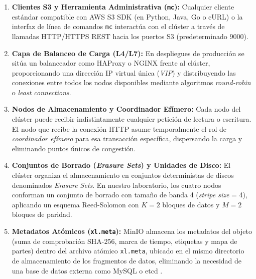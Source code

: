 \documentclass[12pt,a4paper]{article}
\begin{document}
\begin{enumerate}[leftmargin=*]
    \item \textbf{Clientes S3 y Herramienta Administrativa (\texttt{mc}):} Cualquier cliente estándar compatible con AWS S3 SDK (en Python, Java, Go o cURL) o la interfaz de línea de comandos \texttt{mc} interactúa con el clúster a través de llamadas HTTP/HTTPS REST hacia los puertos S3 (predeterminado 9000).
    \item \textbf{Capa de Balanceo de Carga (L4/L7):} En despliegues de producción se sitúa un balanceador como HAProxy o NGINX frente al clúster, proporcionando una dirección IP virtual única (\emph{VIP}) y distribuyendo las conexiones entre todos los nodos disponibles mediante algoritmos \emph{round-robin} o \emph{least connections}.
    \item \textbf{Nodos de Almacenamiento y Coordinador Efímero:} Cada nodo del clúster puede recibir indistintamente cualquier petición de lectura o escritura. El nodo que recibe la conexión HTTP asume temporalmente el rol de \emph{coordinador efímero} para esa transacción específica, dispersando la carga y eliminando puntos únicos de congestión.
    \item \textbf{Conjuntos de Borrado (\emph{Erasure Sets}) y Unidades de Disco:} El clúster organiza el almacenamiento en conjuntos deterministas de discos denominados \emph{Erasure Sets}. En nuestro laboratorio, los cuatro nodos conforman un conjunto de borrado con tamaño de banda 4 (\emph{stripe size} = 4), aplicando un esquema Reed-Solomon con $K=2$ bloques de datos y $M=2$ bloques de paridad.
    \item \textbf{Metadatos Atómicos (\texttt{xl.meta}):} MinIO almacena los metadatos del objeto (suma de comprobación SHA-256, marca de tiempo, etiquetas y mapa de partes) dentro del archivo atómico \texttt{xl.meta}, ubicado en el mismo directorio de almacenamiento de los fragmentos de datos, eliminando la necesidad de una base de datos externa como MySQL o etcd \cite{han2025rdio}.
\end{enumerate}
\end{document}
